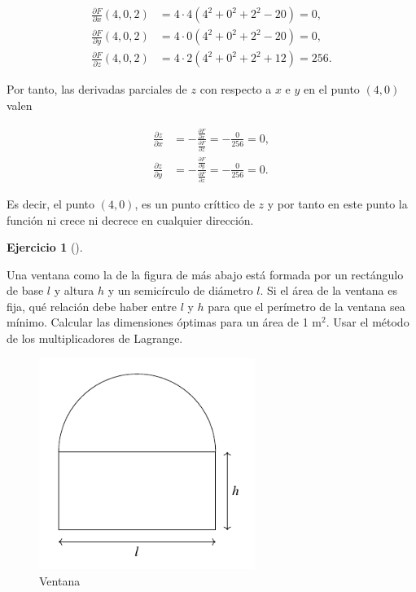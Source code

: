 \documentclass[
  spanish,
  a4paper,
]{scrreport}
\theoremstyle{definition}
\newtheorem{exercise}{Ejercicio}[chapter]
\theoremstyle{remark}
\begin{document}
\begin{tcolorbox}
\begin{enumerate}
  \begin{align*}
  \frac{\partial F}{\partial x}(4,0,2)
  &= 4\cdot 4(4^2+0^2+2^2-20) = 0, \\
  \frac{\partial F}{\partial y}(4,0,2)
  &= 4\cdot 0(4^2+0^2+2^2-20) = 0, \\
  \frac{\partial F}{\partial z}(4,0,2)
  &= 4\cdot 2(4^2+0^2+2^2+12) = 256.
  \end{align*}

  Por tanto, las derivadas parciales de \(z\) con respecto a \(x\) e
  \(y\) en el punto \((4,0)\) valen

  \begin{align*}
  \frac{\partial z}{\partial x}
  &= -\frac{\frac{\partial F}{\partial x}}{\frac{\partial F}{\partial z}}
  = -\frac{0}{256} = 0, \\
  \frac{\partial z}{\partial y}
  &= -\frac{\frac{\partial F}{\partial y}}{\frac{\partial F}{\partial z}}
  = -\frac{0}{256} = 0.
  \end{align*}

  Es decir, el punto \((4,0)\), es un punto críttico de \(z\) y por
  tanto en este punto la función ni crece ni decrece en cualquier
  dirección.
\end{enumerate}

\end{tcolorbox}

\begin{exercise}[]\protect\hypertarget{exr-4}{}\label{exr-4}

Una ventana como la de la figura de más abajo está formada por un
rectángulo de base \(l\) y altura \(h\) y un semicírculo de diámetro
\(l\). Si el área de la ventana es fija, qué relación debe haber entre
\(l\) y \(h\) para que el perímetro de la ventana sea mínimo. Calcular
las dimensiones óptimas para un área de 1 m\(^2\). Usar el método de los
multiplicadores de Lagrange.

\begin{figure}[H]

{\centering \includegraphics[width=7cm,height=\textheight,keepaspectratio]{img/examen-2024-12-20/ventana.pdf}

}

\caption{Ventana}

\end{figure}%

\end{exercise}
\end{document}

